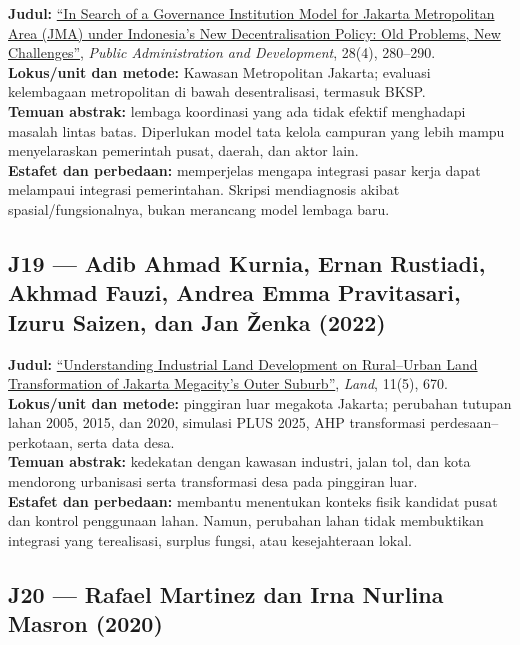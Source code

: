 \documentclass[
  indonesian,
  11pt,
  a4paper,
  oneside,
  openany]{report}
\begin{document}
\textbf{Judul:} \href{https://doi.org/10.1002/pad.504}{``In Search of a
Governance Institution Model for Jakarta Metropolitan Area (JMA) under
Indonesia's New Decentralisation Policy: Old Problems, New
Challenges''}, \emph{Public Administration and Development}, 28(4),
280--290.\\
\textbf{Lokus/unit dan metode:} Kawasan Metropolitan Jakarta; evaluasi
kelembagaan metropolitan di bawah desentralisasi, termasuk BKSP.\\
\textbf{Temuan abstrak:} lembaga koordinasi yang ada tidak efektif
menghadapi masalah lintas batas. Diperlukan model tata kelola campuran
yang lebih mampu menyelaraskan pemerintah pusat, daerah, dan aktor
lain.\\
\textbf{Estafet dan perbedaan:} memperjelas mengapa integrasi pasar
kerja dapat melampaui integrasi pemerintahan. Skripsi mendiagnosis
akibat spasial/fungsionalnya, bukan merancang model lembaga baru.

\subsection{J19 --- Adib Ahmad Kurnia, Ernan Rustiadi, Akhmad Fauzi,
Andrea Emma Pravitasari, Izuru Saizen, dan Jan Ženka
(2022)}\label{j19-adib-ahmad-kurnia-ernan-rustiadi-akhmad-fauzi-andrea-emma-pravitasari-izuru-saizen-dan-jan-ux17eenka-2022}

\textbf{Judul:}
\href{https://doi.org/10.3390/land11050670}{``Understanding Industrial
Land Development on Rural--Urban Land Transformation of Jakarta
Megacity's Outer Suburb''}, \emph{Land}, 11(5), 670.\\
\textbf{Lokus/unit dan metode:} pinggiran luar megakota Jakarta;
perubahan tutupan lahan 2005, 2015, dan 2020, simulasi PLUS 2025, AHP
transformasi perdesaan--perkotaan, serta data desa.\\
\textbf{Temuan abstrak:} kedekatan dengan kawasan industri, jalan tol,
dan kota mendorong urbanisasi serta transformasi desa pada pinggiran
luar.\\
\textbf{Estafet dan perbedaan:} membantu menentukan konteks fisik
kandidat pusat dan kontrol penggunaan lahan. Namun, perubahan lahan
tidak membuktikan integrasi yang terealisasi, surplus fungsi, atau
kesejahteraan lokal.

\subsection{J20 --- Rafael Martinez dan Irna Nurlina Masron
(2020)}\label{j20-rafael-martinez-dan-irna-nurlina-masron-2020}
\end{document}

